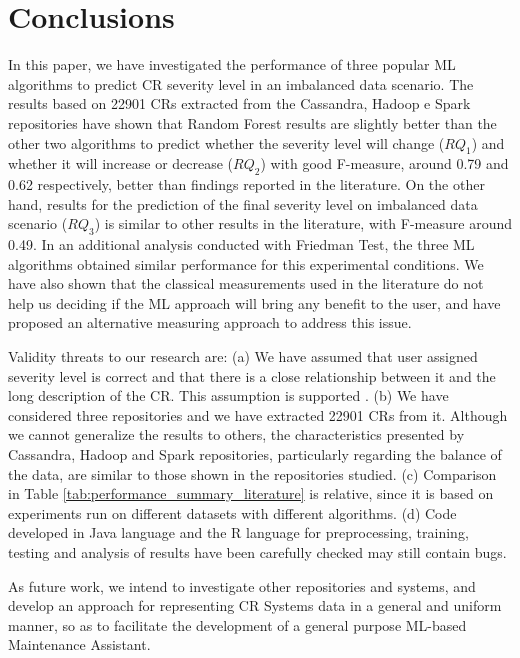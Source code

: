 \section{Conclusions} \label{sec:conclusion}

In this paper, we have investigated the performance of  three popular ML algorithms to predict CR severity level in an imbalanced data scenario. The results based on 22901 CRs extracted from the Cassandra, Hadoop e Spark repositories have shown that Random Forest results are slightly better than the other two algorithms to predict whether the severity level will change ($RQ_1$) and whether it will increase or decrease ($RQ_2$) with good F-measure, around 0.79 and 0.62 respectively, better than findings reported in the literature.  On the other hand, results for the prediction of the final severity level on imbalanced data scenario ($RQ_3$) is similar to other results in the literature, with F-measure around 0.49. In an additional analysis conducted with Friedman Test, the three ML algorithms obtained similar performance for this experimental conditions. We have also shown that the classical measurements used in the literature do not help us deciding if the ML approach will bring any benefit to the user, and have proposed an alternative measuring approach to address this issue.

Validity threats to our research are: (a) We have assumed that user assigned severity level is correct and that there is a close relationship between it and the long description of the CR. This assumption is supported  \cite{Lamkanfi2010, Tian2012}. (b) We have considered three repositories and we have extracted 22901 CRs from it. Although we cannot generalize the results to others, the characteristics presented by Cassandra, Hadoop and Spark repositories, particularly regarding the balance of the data, are similar to those shown in the repositories studied\cite{Lamkanfi2010, Lamkanfi2011, Tian2012,ValdiviaGarcia2014}. (c) Comparison in Table \ref{tab:performance_summary_literature} is relative, since it is based on experiments run on different datasets with different algorithms. (d) Code developed in Java language and the R language for preprocessing, training, testing and analysis of results have been carefully checked may still contain bugs.

As future work, we intend to investigate other repositories and systems, and develop an approach for representing CR Systems data in a general and uniform manner, so as to facilitate the development of a general purpose ML-based Maintenance Assistant. 
